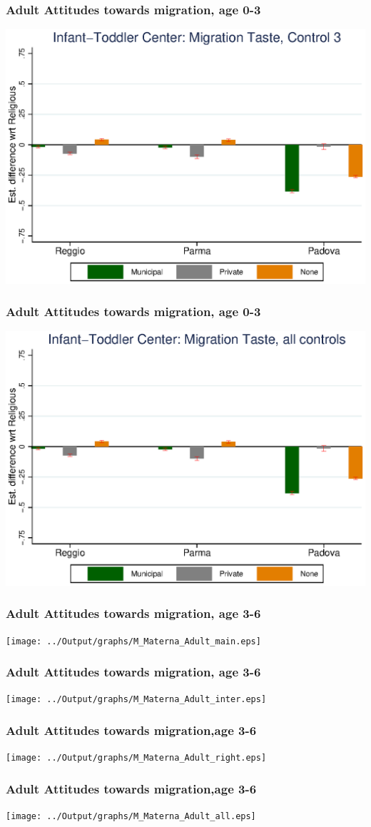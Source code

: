 \documentclass{beamer}
\begin{document}
\begin{frame}\frametitle{Adult Attitudes towards migration, age 0-3}
\center
\includegraphics[scale=0.7]{../Output/graphs/M_Asilo_Adult_right.eps}
\end{frame}

\begin{frame}\frametitle{Adult Attitudes towards migration, age 0-3}
\center
\includegraphics[scale=0.7]{../Output/graphs/M_Asilo_Adult_all.eps}
\end{frame}


\begin{frame}\frametitle{Adult Attitudes towards migration, age 3-6}
\center
\texttt{[image: ../Output/graphs/M\_Materna\_Adult\_main.eps]}
\end{frame}

\begin{frame}\frametitle{Adult Attitudes towards migration, age 3-6}
\center
\texttt{[image: ../Output/graphs/M\_Materna\_Adult\_inter.eps]}
\end{frame}

\begin{frame}\frametitle{Adult Attitudes towards migration,age 3-6}
\center
\texttt{[image: ../Output/graphs/M\_Materna\_Adult\_right.eps]}
\end{frame}

\begin{frame}\frametitle{Adult Attitudes towards migration,age 3-6}
\center
\texttt{[image: ../Output/graphs/M\_Materna\_Adult\_all.eps]}
\end{frame}
\end{document}
